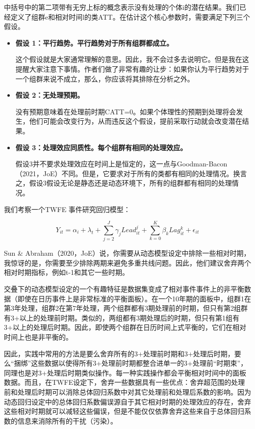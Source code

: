 \documentclass[cn,12pt,math=newtx,citestyle=gb7714-2015,bibstyle=gb7714-2015]{elegantbook}
\begin{document}
	中括号中的第二项带有无穷上标的概念表示没有处理的个体i的潜在结果。我们已经定义了组群e和相对时间l的类ATT。在估计这个核心参数时，需要满足下列三个假设。
	
	\begin{itemize}
		\item \textbf{假设 1：平行趋势。平行趋势对于所有组群都成立。}
		
		这个假设就是大家通常理解的意思。因此，我不会过多去说明它。但是我在这提醒大家注意下事情。作者们做了非常有趣的让步：如果你认为平行趋势对于一个组群来说不成立，那么，你应该将其排除在分析之外。
		\item \textbf{假设 2：无处理预期。}
		
		没有预期意味着在处理前时期CATT=0。如果个体理性的预期到处理将会发生，他们可能会改变行为，从而违反这个假设，提前采取行动就会改变潜在结果。
		
		\item \textbf{假设 3：处理效应同质性。每个组群有相同的处理效应。}
		
		假设3并不要求处理效应在时间上是恒定的，这一点与Goodman-Bacon（2021，JoE）不同。但是，它要求对于所有的类都有相同的处理情况。换言之，假设3假设无论是静态还是动态环境下，所有的组群都有相同的处理情况。
		
		
	\end{itemize}
	
	我们考察一个TWFE 事件研究回归模型：
	
	 \begin{equation}
		Y_{it}=\alpha_i+\lambda_t+\sum_{j=2}^J \gamma_j Lead_{it}^j +\sum_{k=0}^K \beta_k Lag_{it}^k   +\epsilon_{it}
	\end{equation}
	
	Sun \& Abraham（2020，JoE）说，你需要从动态模型设定中排除一些相对时期，我惊讶的是，你需要至少排除两期来避免多重共线问题。因此，他们建议舍弃两个相对时期指标，例如t-1和其它一些时期。
	
	交叠下的动态模型设定的一个有趣特征是数据集变成了相对事件事件上的非平衡数据（即使在日历事件上是非常标准的平衡面板）。在一个10年期的面板中，组群1在第3年处理，组群2在第7年处理，两个组群都有3期处理前的时期，但只有第2组群有3+以上的处理前时期。类似的，两组都有3期处理后的时期，但只有第1组有3+以上的处理后时期。因此，即使两个组群在日历时间上式平衡的，它们在相对时间上也是非平衡的。
	
	因此，实践中常用的方法是要么舍弃所有的3+处理前时期和3+处理后时期，要么“捆绑”这些数据以使得所有3+处理前时期都整合进单一的3+处理前“时期束”，同理也是对3+处理后时期类似操作。每一种实践操作都会平衡相对时间中的面板数据。而且，在TWFE设定下，舍弃一些数据具有一些优点：舍弃超范围的处理前和处理后时期可以消除总体回归系数中对其它处理前和处理后系数的影响。因为动态回归设定中的总体回归系数偏误源自于其它相对时期的处理效应的存在，舍弃这些相对时期就可以减轻这些偏误，但是不能仅仅依靠舍弃这些来自于总体回归系数的信息来消除所有的干扰（污染）。
	
\end{document}
